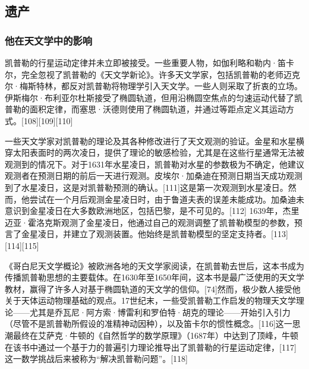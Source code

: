 \subsection{遗产} 
\subsubsection{他在天文学中的影响}

凯普勒的行星运动定律并未立即被接受。一些重要人物，如伽利略和勒内·笛卡尔，完全忽视了凯普勒的《天文学新论》。许多天文学家，包括凯普勒的老师迈克尔·梅斯特林，都反对凯普勒将物理学引入天文学。一些人则采取了折衷的立场。伊斯梅尔·布利亚尔杜斯接受了椭圆轨道，但用沿椭圆空焦点的匀速运动代替了凯普勒的面积定律，而塞思·沃德则使用了椭圆轨道，并通过等距点定义其运动方式。[108][109][110]

一些天文学家对凯普勒的理论及其各种修改进行了天文观测的验证。金星和水星横穿太阳表面时的两次凌日，提供了理论的敏感检验，尤其是在这些行星通常无法被观测到的情况下。对于1631年水星凌日，凯普勒对水星的参数极为不确定，他建议观测者在预测日期的前后一天进行观测。皮埃尔·加桑迪在预测日期当天成功观测到了水星凌日，这是对凯普勒预测的确认。[111]这是第一次观测到水星凌日。然而，他尝试在一个月后观测金星凌日时，由于鲁道夫表的误差未能成功。加桑迪未意识到金星凌日在大多数欧洲地区，包括巴黎，是不可见的。[112] 1639年，杰里迈亚·霍洛克斯观测了金星凌日，他通过自己的观测调整了凯普勒模型的参数，预言了金星凌日，并建立了观测装置。他始终是凯普勒模型的坚定支持者。[113][114][115]

《哥白尼天文学概论》被欧洲各地的天文学家阅读，在凯普勒去世后，这本书成为传播凯普勒思想的主要载体。在1630年至1650年间，这本书是最广泛使用的天文学教材，赢得了许多人对基于椭圆轨道的天文学的信仰。[74]然而，极少数人接受他关于天体运动物理基础的观点。17世纪末，一些受凯普勒工作启发的物理天文学理论——尤其是乔瓦尼·阿方索·博雷利和罗伯特·胡克的理论——开始引入引力（尽管不是凯普勒所假设的准精神动因种），以及笛卡尔的惯性概念。[116]这一思潮最终在艾萨克·牛顿的《自然哲学的数学原理》（1687年）中达到了顶峰，牛顿在该书中通过一个基于力的普遍引力理论推导出了凯普勒的行星运动定律，[117] 这一数学挑战后来被称为“解决凯普勒问题”。[118]
